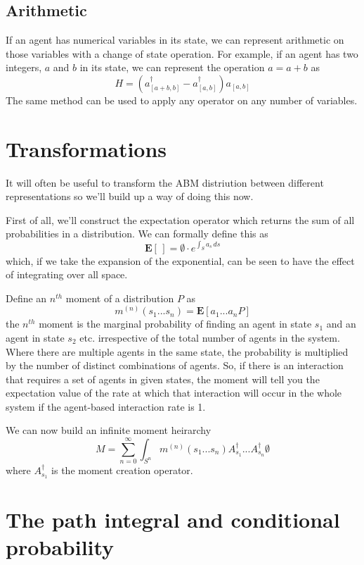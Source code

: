 \documentclass[letterpaper,twocolumn,10pt]{article}
\begin{document}
\subsection{Arithmetic}

If an agent has numerical variables in its state, we can represent arithmetic on those variables with a change of state operation. For example, if an agent has two integers, $a$ and $b$ in its state, we can represent the operation $a = a + b$ as
\[
H = (a^\dag_{[a+b,b]} - a_{[a,b]}^\dag)a_{[a,b]}
\]
The same method can be used to apply any operator on any number of variables.

\section{Transformations}

It will often be useful to transform the ABM distriution between different representations so we'll build up a way of doing this now.

First of all, we'll construct the expectation operator which returns the sum of all probabilities in a distribution. We can formally define this as
\[
\mathbf{E}[\, ] = \emptyset \cdot e^{\int_S a_s \, ds}
\]
which, if we take the expansion of the exponential, can be seen to have the effect of integrating over all space.

Define an $n^{th}$ moment of a distribution $P$ as
\[
m^{(n)}(s_1...s_n) = \mathbf{E}[a_1...a_n P]
\]
the $n^{th}$ moment is the marginal probability of finding an agent in state $s_1$ and an agent in state $s_2$ etc. irrespective of the total number of agents in the system. Where there are multiple agents in the same state, the probability is multiplied by the number of distinct combinations of agents. So, if there is an interaction that requires a set of agents in given states, the moment will tell you the expectation value of the rate at which that interaction will occur in the whole system if the agent-based interaction rate is 1.

We can now build an infinite moment heirarchy
\[
M = \sum_{n=0}^\infty \int_{S^n}  m^{(n)}(s_1...s_n)A_{s_1}^\dag...A_{s_n}^\dag\emptyset 
\]
where $A_{s_1}^\dag$ is the moment creation operator.


\section{The path integral and conditional probability}
\end{document}
